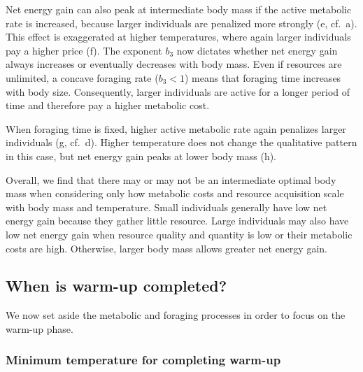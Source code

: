 Net energy gain can also peak at intermediate body mass if the active metabolic rate is increased, because larger individuals are penalized more strongly (e, cf.~a).
This effect is exaggerated at higher temperatures, where again larger individuals pay a higher price (f).
The exponent $b_3$ now dictates whether net energy gain always increases or eventually decreases with body mass.
Even if resources are unlimited, a concave foraging rate ($b_3 < 1$) means that foraging time increases with body size.
Consequently, larger individuals are active for a longer period of time and therefore pay a higher metabolic cost.

When foraging time is fixed, higher active metabolic rate again penalizes larger individuals (g, cf.~d).
Higher temperature does not change the qualitative pattern in this case, but net energy gain peaks at lower body mass (h).

Overall, we find that there may or may not be an intermediate optimal body mass when considering only how metabolic costs and resource acquisition scale with body mass and temperature.
Small individuals generally have low net energy gain because they gather little resource. %
Large individuals may also have low net energy gain when resource quality and quantity is low or their metabolic costs are high.
Otherwise, larger body mass allows greater net energy gain.


\subsection*{When is warm-up completed?}

We now set aside the metabolic and foraging processes in order to focus on the warm-up phase.

\subsubsection*{Minimum temperature for completing warm-up}

